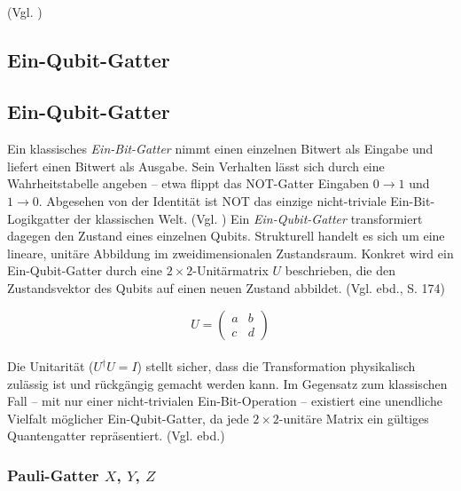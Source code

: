 \\
(Vgl. \cite{PhysRevApplied.23.034052}) \\


\subsection{Ein-Qubit-Gatter}


\subsection{Ein-Qubit-Gatter}
Ein klassisches \emph{Ein-Bit-Gatter} nimmt einen einzelnen Bitwert als Eingabe und liefert einen Bitwert als Ausgabe. Sein Verhalten lässt sich durch eine Wahrheitstabelle angeben – etwa flippt das NOT-Gatter Eingaben $0 \rightarrow 1$ und $1 \rightarrow 0$. Abgesehen von der Identität ist NOT das einzige nicht-triviale Ein-Bit-Logikgatter der klassischen Welt. (Vgl. \cite[S.17f.]{nielsen_quantum_2010}) Ein \emph{Ein-Qubit-Gatter} transformiert dagegen den Zustand eines einzelnen Qubits. Strukturell handelt es sich um eine lineare, unitäre Abbildung im zweidimensionalen Zustandsraum. Konkret wird ein Ein-Qubit-Gatter durch eine $2\times 2$-Unitärmatrix $U$ beschrieben, die den Zustandsvektor des Qubits auf einen neuen Zustand abbildet. (Vgl. ebd., S. 174)

\begin{equation}
U = \begin{pmatrix}
a & b \\
c & d
\end{pmatrix}
\end{equation}
\\
Die Unitarität ($U^{\dagger}U = I$) stellt sicher, dass die Transformation physikalisch zulässig ist und rückgängig gemacht werden kann. Im Gegensatz zum klassischen Fall – mit nur einer nicht-trivialen Ein-Bit-Operation – existiert eine unendliche Vielfalt möglicher Ein-Qubit-Gatter, da jede $2\times 2$-unitäre Matrix ein gültiges Quantengatter repräsentiert. (Vgl. ebd.)



\subsubsection{Pauli-Gatter $X$, $Y$, $Z$}\label{sec:pauli_gatter}

